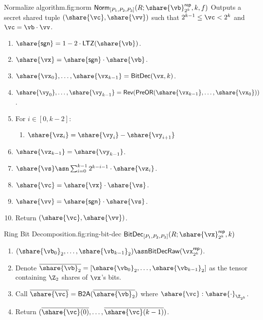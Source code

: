 \begin{Boxfig}{Normalize algorithm.}{fig:norm}
  {$\mathsf{Norm}_{[P_1, P_2, P_3]}(R; \share{\vb}^\mathsf{rep}_{2^k}, k, f)$}
  Outputs a secret shared tuple $(\share{\vc}, \share{\vv})$ such that $2^{k-1} \leq \vc < 2^k$ and $\vc = \vb \cdot \vv$.
  \begin{enumerate}
    \item $\share{\mathsf{sgn}} = 1 - 2 \cdot \mathsf{LTZ}(\share{\vb})$.
    \item $\share{\vx} = \share{\mathsf{sgn}} \cdot \share{\vb}$.
    \item $\share{\vx_0}, \dots, \share{\vx_{k-1}} = \mathsf{BitDec}(\vx, k)$.
    \item $\share{\vy_0}, \dots, \share{\vy_{k-1}} = \mathsf{Rev}(\mathsf{PreOR}(\share{\vx_{k-1}}, \dots, \share{\vx_0}))$.
    \item For $i \in [0, k-2]$:
    \begin{enumerate}
        \item $\share{\vz_i} = \share{\vy_i} - \share{\vy_{i+1}}$
    \end{enumerate}
    \item $\share{\vz_{k-1}} = \share{\vy_{k-1}}$.
    \item $\share{\vs} \asn \sum_{i=0}^{k-1}2^{k-i-1} \cdot \share{\vz_i}$.
    \item $\share{\vc} = \share{\vx} \cdot \share{\vs}$.
    \item $\share{\vv} = \share{\mathsf{sgn}} \cdot \share{\vs}$.
    \item Return $(\share{\vc}, \share{\vv})$.
\end{enumerate}
\end{Boxfig}



\begin{Boxfig}{Ring Bit Decomposition.}{fig:ring-bit-dec}
  {$\mathsf{BitDec}_{[P_1, P_2, P_3]}(R; \share{\vx}^\mathsf{rep}_{2^k}, k)$}
  \begin{enumerate}
  \item $(\share{\vb_0}_2, \dots, \share{\vb_{k-1}}_2) \asn \mathsf{BitDecRaw}(\vx^\mathsf{rep}_{2^k})$.
  \item Denote $\overline{\share{\vb}_2} = [\share{\vb_0}_2, \dots, \share{\vb_{k-1}}_2]$ as the tensor containing $\Z_2$ shares of $\vx$'s bits.
  \item Call $\overline{\share{\vc}} = \mathsf{B2A}(\overline{\share{\vb}_2})$ where $\share{\vc}: \share{\cdot}_{\Z_{2^k}}$.
  \item Return $(\overline{\share{\vc}(0)}, \dots, \overline{\share{\vc}(k-1)})$.
\end{enumerate}
\end{Boxfig}


